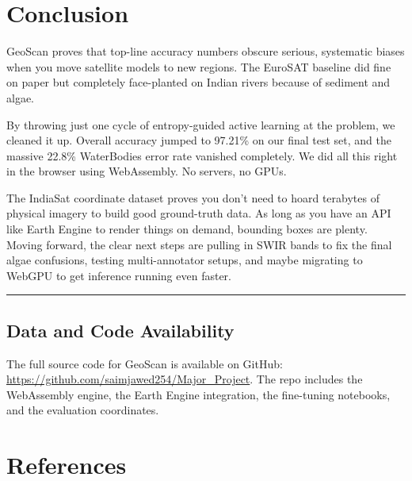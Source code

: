 \documentclass[journal]{IEEEtran}
\begin{document}
\clearpage
\section{Conclusion}

GeoScan proves that top-line accuracy numbers obscure serious,
systematic biases when you move satellite models to new regions. The
EuroSAT baseline did fine on paper but completely face-planted on Indian
rivers because of sediment and algae.

By throwing just one cycle of entropy-guided active learning at the
problem, we cleaned it up. Overall accuracy jumped to 97.21\% on our
final test set, and the massive 22.8\% WaterBodies error rate vanished
completely. We did all this right in the browser using WebAssembly. No
servers, no GPUs.

The IndiaSat coordinate dataset proves you don't need to hoard terabytes
of physical imagery to build good ground-truth data. As long as you have
an API like Earth Engine to render things on demand, bounding boxes are
plenty. Moving forward, the clear next steps are pulling in SWIR bands
to fix the final algae confusions, testing multi-annotator setups, and
maybe migrating to WebGPU to get inference running even faster.

\hrule
\vspace{6pt}

\subsection*{Data and Code Availability}

The full source code for GeoScan is available on GitHub:
\url{https://github.com/saimjawed254/Major_Project}. The repo includes
the WebAssembly engine, the Earth Engine integration, the fine-tuning
notebooks, and the evaluation coordinates.

\clearpage
\section*{References}
\end{document}
